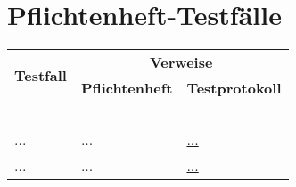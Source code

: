 %



\newpage



\section{Pflichtenheft-Testfälle}
\label{Abschnitt:Tests:Protokoll:Pflichtenheft-Verweise}


\begin{longtable}{p{0.5\hsize}p{0.25\hsize}p{0.25\hsize}}


	    \multirow{2}{*}{\textbf{Testfall}}
	  & \multicolumn{2}{c}{\textbf{Verweise}}
	  
	  \\ [14pt]
	  
	  & {\centering \textbf{Pflichtenheft}}
	  & {\centering \textbf{Testprotokoll}}
	  
	  \\
	  
	     ~ & ~ & ~
	  
	  \\


	  ...
	& {\centering ...}
	& {\centering \href{#nofollow}{...}}
	
	\\
	
	  ...
	& {\centering ...}
	& {\centering \href{#nofollow}{...}}
	
	\\
	

\end{longtable}




